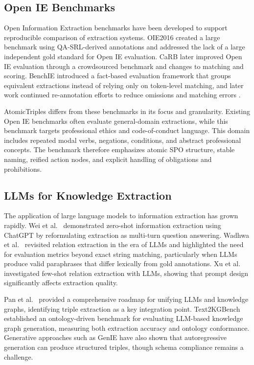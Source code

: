 \documentclass[conference]{IEEEtran}
\begin{document}
\subsection{Open IE Benchmarks}
Open Information Extraction benchmarks have been developed to support reproducible comparison of extraction systems. OIE2016 \cite{stanovsky2016creating} created a large benchmark using QA-SRL-derived annotations and addressed the lack of a large independent gold standard for Open IE evaluation. CaRB \cite{bhardwaj2019carb} later improved Open IE evaluation through a crowdsourced benchmark and changes to matching and scoring. BenchIE \cite{gashteovski2022benchie} introduced a fact-based evaluation framework that groups equivalent extractions instead of relying only on token-level matching, and later work continued re-annotation efforts to reduce omissions and matching errors \cite{lamarche2024benchiefl}.

AtomicTriples differs from these benchmarks in its focus and granularity. Existing Open IE benchmarks often evaluate general-domain extractions, while this benchmark targets professional ethics and code-of-conduct language. This domain includes repeated modal verbs, negations, conditions, and abstract professional concepts. The benchmark therefore emphasizes atomic SPO structure, stable naming, reified action nodes, and explicit handling of obligations and prohibitions.

\subsection{LLMs for Knowledge Extraction}
The application of large language models to information extraction has grown rapidly. Wei et al.\ \cite{wei2023chatie} demonstrated zero-shot information extraction using ChatGPT by reformulating extraction as multi-turn question answering. Wadhwa et al.\ \cite{wadhwa2023revisiting} revisited relation extraction in the era of LLMs and highlighted the need for evaluation metrics beyond exact string matching, particularly when LLMs produce valid paraphrases that differ lexically from gold annotations. Xu et al.\ \cite{xu2023unleash} investigated few-shot relation extraction with LLMs, showing that prompt design significantly affects extraction quality.

Pan et al.\ \cite{pan2024unifying} provided a comprehensive roadmap for unifying LLMs and knowledge graphs, identifying triple extraction as a key integration point. Text2KGBench \cite{mihindukulasooriya2023text2kgbench} established an ontology-driven benchmark for evaluating LLM-based knowledge graph generation, measuring both extraction accuracy and ontology conformance. Generative approaches such as GenIE \cite{josifoski2022genie} have also shown that autoregressive generation can produce structured triples, though schema compliance remains a challenge.
\end{document}
